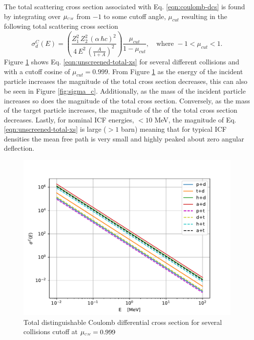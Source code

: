 The total scattering cross section associated with Eq. \eqref{eqn:coulomb-dcs} is found by integrating over $\mucm$ from $-1$ to some cutoff angle, $\mu_{cut}$ resulting in the following total scattering cross section
\begin{equation} \label{eqn:unscreened-total-xs}
    \sigma^C_d(E) = \left(\dfrac{Z_1^2 \, Z_2^2 \, \left(\alpha \, \hbar c\right)^2}{ 4 \, E^2 \, \left(\frac{A}{1 + A} \right)^2}\right) \dfrac{\mu_{cut}}{1-\mu_{cut}}, \quad \text{where} \,\, -1 < \mu_{cut} < 1.
\end{equation}
Figure \ref{fig:sigma_c_total} shows Eq. \eqref{eqn:unscreened-total-xs} for several different collisions and with a cutoff cosine of $\mu_{cut} = 0.999$. From Figure \ref{fig:sigma_c_total} as the energy of the incident particle increases the magnitude of the total cross section decreases, this can also be seen in Figure \ref{fig:sigma_c}. Additionally, as the mass of the incident particle increases so does the magnitude of the total cross section. Conversely, as the mass of the target particle increases, the magnitude of the of the total cross section decreases. Lastly, for nominal ICF energies, $<10$ MeV, the magnitude of Eq. \eqref{eqn:unscreened-total-xs} is large ($>1$ barn) meaning that for typical ICF densities the mean free path is very small and highly peaked about zero angular deflection.
\begin{figure}[!htb]
    \centering
    \includegraphics[scale=0.75]{../figures/interaction_physics/total-sigma-C.pdf}
    \caption{Total distinguishable Coulomb differential cross section for several collisions cutoff at $\mucm = 0.999$}
    \label{fig:sigma_c_total}
\end{figure}

